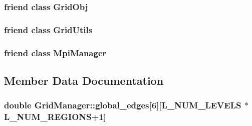 \subsubsection[{\texorpdfstring{Grid\+Obj}{GridObj}}]{\setlength{\rightskip}{0pt plus 5cm}friend class {\bf Grid\+Obj}\hspace{0.3cm}{\ttfamily [friend]}}\hypertarget{class_grid_manager_a55cfec1721fb1b9d9e7592bd6288c998}{}\label{class_grid_manager_a55cfec1721fb1b9d9e7592bd6288c998}
\subsubsection[{\texorpdfstring{Grid\+Utils}{GridUtils}}]{\setlength{\rightskip}{0pt plus 5cm}friend class {\bf Grid\+Utils}\hspace{0.3cm}{\ttfamily [friend]}}\hypertarget{class_grid_manager_a8891d532b9568ad83535721b0e6b79c9}{}\label{class_grid_manager_a8891d532b9568ad83535721b0e6b79c9}
\subsubsection[{\texorpdfstring{Mpi\+Manager}{MpiManager}}]{\setlength{\rightskip}{0pt plus 5cm}friend class {\bf Mpi\+Manager}\hspace{0.3cm}{\ttfamily [friend]}}\hypertarget{class_grid_manager_a831466b4226dde3791b04756e4cfa6fc}{}\label{class_grid_manager_a831466b4226dde3791b04756e4cfa6fc}


\subsection{Member Data Documentation}
\subsubsection[{\texorpdfstring{global\+\_\+edges}{global_edges}}]{\setlength{\rightskip}{0pt plus 5cm}double Grid\+Manager\+::global\+\_\+edges\mbox{[}6\mbox{]}\mbox{[}{\bf L\+\_\+\+N\+U\+M\+\_\+\+L\+E\+V\+E\+LS} $\ast${\bf L\+\_\+\+N\+U\+M\+\_\+\+R\+E\+G\+I\+O\+NS}+1\mbox{]}\hspace{0.3cm}{\ttfamily [protected]}}\hypertarget{class_grid_manager_af356c317de941f23795781ecfd6f3d25}{}\label{class_grid_manager_af356c317de941f23795781ecfd6f3d25}


